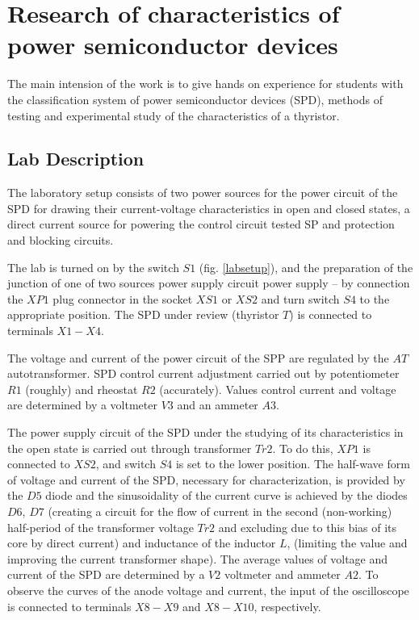 \documentclass[a4paper,14pt]{article}
\begin{document}
\section{Research of characteristics of power semiconductor devices}

The main intension of the work is to give hands on experience for students 
with the classification system of power semiconductor devices (SPD),
methods of testing and experimental study of the characteristics of a thyristor.

\subsection{Lab Description}

The laboratory setup consists of two power sources for the power circuit of the SPD for drawing their current-voltage
characteristics in open and closed states, a direct current source for powering the control circuit
tested SP and protection and blocking circuits.

The lab is turned on by the switch $S1$ (fig. \ref{labsetup}), and the preparation of the junction of one of two sources
power supply circuit power supply -- by connection the $XP1$ plug connector in the socket $XS1$ or $XS2$ and turn
switch $S4$ to the appropriate position. The SPD under review (thyristor $T$) is connected to terminals $X1-X4$.

The voltage and current of the power circuit of the SPP are regulated by the $AT$ autotransformer. 
SPD control current adjustment
carried out by potentiometer $R1$ (roughly) and rheostat $R2$ (accurately). Values  control current and voltage
are determined by a voltmeter $V3$ and an ammeter $A3$.

The power supply circuit of the SPD under the studying of its characteristics 
in the open state is carried out through transformer $Tr2$. 
To do this, $XP1$ is connected to $XS2$, and switch $S4$ is set to the lower position.
The half-wave form of voltage and current of the SPD, necessary for characterization, 
is provided by the $D5$ diode
and the sinusoidality of the current curve is achieved by the diodes $D6$, $D7$ 
(creating a circuit for the flow of current
in the second (non-working) half-period of the transformer voltage $Tr2$ and excluding due to this bias
of its core by direct current) and inductance of the inductor $L$, 
(limiting the value and improving the current transformer shape). 
The average values of voltage and current of the SPD are determined by a $V2$ voltmeter
and ammeter $A2$. To observe the curves of the anode voltage and current, 
the input of the oscilloscope is connected
to terminals $X8-X9$ and $X8-X10$, respectively.
\end{document}
